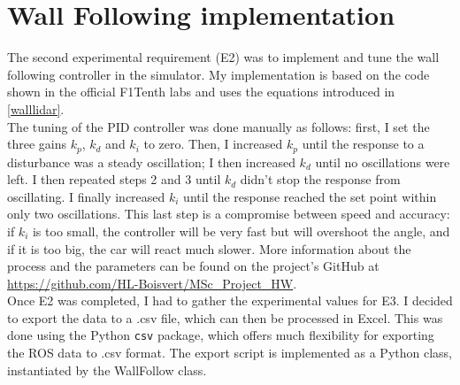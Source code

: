 \section{Wall Following implementation}
The second experimental requirement (E2) was to implement and tune the wall following controller in the simulator. My implementation is based on the code shown in the official F1Tenth labs and uses the equations introduced in \ref{walllidar}. \\
The tuning of the PID controller was done manually as follows: first, I set the three gains $k_p$, $k_d$ and $k_i$ to zero. Then, I increased $k_p$ until the response to a disturbance was a steady oscillation; I then increased $k_d$ until no oscillations were left. I then repeated steps 2 and 3 until $k_d$ didn't stop the response from oscillating. I finally increased $k_i$ until the response reached the set point within only two oscillations. This last step is a compromise between speed and accuracy: if $k_i$ is too small, the controller will be very fast but will overshoot the angle, and if it is too big, the car will react much slower. More information about the process and the parameters can be found on the project's GitHub at \url{https://github.com/HL-Boisvert/MSc_Project_HW}. \\
Once E2 was completed, I had to gather the experimental values for E3. I decided to export the data to a .csv file, which can then be processed in Excel. This was done using the Python \verb|csv| package, which offers much flexibility for exporting the ROS data to .csv format. The export script is implemented as a Python class, instantiated by the WallFollow class. 

